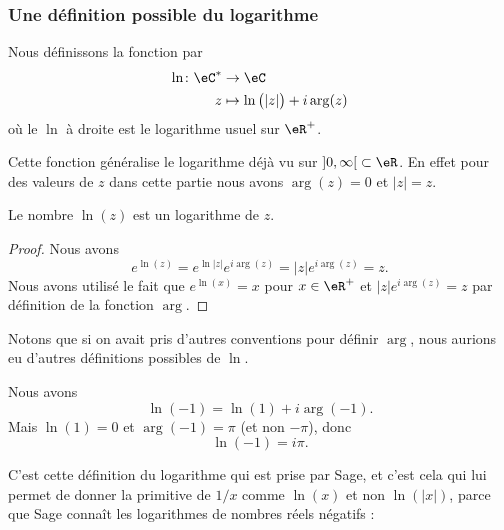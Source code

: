 \subsubsection{Une définition possible du logarithme}

\begin{definition}      \label{DEFooWDYNooYIXVMC}
	Nous définissons la fonction  par
	\begin{equation}
		\begin{aligned}
			\ln\colon \eC^* & \to \eC                               \\
			z               & \mapsto \ln\big( | z | \big)+i\arg(z)
		\end{aligned}
	\end{equation}
	où le \( \ln\) à droite est le logarithme usuel sur \( \eR^+\).
\end{definition}

\begin{remark}
	Cette fonction généralise le logarithme déjà vu sur \( \mathopen] 0 , \infty \mathclose[\subset \eR\). En effet pour des valeurs de \( z\) dans cette partie nous avons \( \arg(z)=0\) et \( | z |=z\).
\end{remark}

\begin{lemma}
	Le nombre \( \ln(z)\) est un logarithme de \( z\).
\end{lemma}

\begin{proof}
	Nous avons
	\begin{equation}
		e^{\ln(z)}= e^{\ln| z |} e^{i\arg(z)}=| z | e^{i\arg(z)}=z.
	\end{equation}
	Nous avons utilisé le fait que \(  e^{\ln(x)}=x\) pour \( x\in\eR^+\) et \( | z | e^{i\arg(z)}=z\) par définition de la fonction \( \arg\).
\end{proof}

Notons que si on avait pris d'autres conventions pour définir \( \arg\), nous aurions eu d'autres définitions possibles de \( \ln\).

\begin{example}
	Nous avons
	\begin{equation}
		\ln(-1)=\ln(1)+i\arg(-1).
	\end{equation}
	Mais \( \ln(1)=0\) et \( \arg(-1)=\pi\) (et non \( -\pi\)), donc
	\begin{equation}
		\ln(-1)=i\pi.
	\end{equation}

	C'est cette définition du logarithme qui est prise par Sage, et c'est cela qui lui permet de donner la primitive de \( 1/x\) comme \( \ln(x)\) et non \( \ln(| x |)\), parce que Sage connaît les logarithmes de nombres réels négatifs :
	
\end{example}

